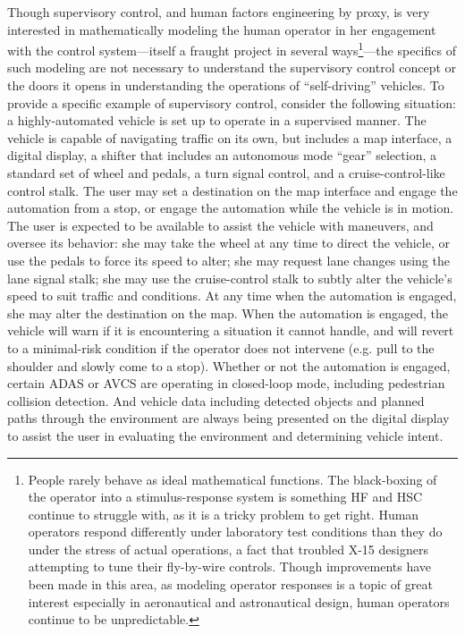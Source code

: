 Though supervisory control, and human factors engineering by proxy, is
very interested in mathematically modeling the human operator in her
engagement with the control system---itself a fraught project in
several ways\footnote{People rarely behave as ideal mathematical
  functions. The black-boxing of the operator into a stimulus-response
system is something HF and HSC continue to struggle with, as it is a
tricky problem to get right. Human operators respond differently under
laboratory test conditions than they do under the stress of actual
operations, a fact that troubled X-15 designers attempting to tune
their fly-by-wire controls.\cite[p. ???]{???-digitalApollo} Though
improvements have been made in this area, as modeling operator
responses is a topic of great interest especially in aeronautical and
astronautical design, human operators continue to be
unpredictable.}---the specifics of such modeling are not necessary to
understand the supervisory control concept or the doors it opens in
understanding the operations of ``self-driving'' vehicles. To provide
a specific example of supervisory control, consider the following
situation: a highly-automated vehicle is set up to operate in a
supervised manner. The vehicle is capable of navigating traffic on its
own, but includes a map interface, a digital display, a shifter that includes an
autonomous mode ``gear'' selection, a standard set of wheel and
pedals, a turn signal control,
and a cruise-control-like control stalk. The user may set a
destination on the map interface and engage the automation from a stop, or engage
the automation while the vehicle is in motion. The user is expected to
be available to assist the vehicle with maneuvers, and oversee its
behavior:  she may take the wheel at any time to direct the vehicle,
or use the pedals to force its speed to alter; she may request lane
changes using the lane signal stalk; she may use the cruise-control
stalk to subtly alter the vehicle's speed to suit traffic and
conditions. At any time when the automation is engaged, she may alter
the destination on the map. When the automation is engaged, the
vehicle will warn if it is encountering a situation it cannot handle,
and will revert to a minimal-risk condition if the operator does not
intervene (e.g. pull to the shoulder and slowly come to a stop).
Whether or not the automation is engaged,
certain ADAS or AVCS are operating in closed-loop mode, including
pedestrian collision detection. And vehicle data including detected
objects and planned paths through the environment are always being
presented on the digital display to assist the user in evaluating the
environment and determining vehicle intent.

